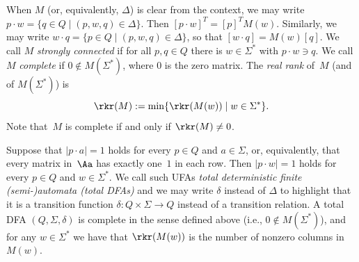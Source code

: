When $M$ (or, equivalently, $\Delta$) is clear from the context, we may write $p \cdot w = \{q \in Q \mid (p,w,q) \in \Delta\}$.
Then $[p \cdot w]^T = [p]^T M(w)$.
Similarly, we may write $w \cdot q = \{p \in Q \mid (p,w,q) \in \Delta\}$, so that $[w \cdot q] = M(w) [q]$. 
We call $M$ \emph{strongly connected} if for all $p,q \in Q$ there is $w \in \Sigma^*$ with $p \cdot w \ni q$. 
We call $M$ \emph{complete} if $0 \not\in M(\Sigma^*)$, where $0$ is the zero matrix.
The \emph{real rank} of~$M$ (and of $M(\Sigma^*)$) is 
\[\rkr(M) := \min\{\rkr(M(w)) \mid w \in \Sigma^*\}.\]
Note that~$M$ is complete if and only if $\rkr(M) \ne 0$.

Suppose that $|p \cdot a| = 1$ holds for every $p \in Q$ and $a \in \Sigma$, or, equivalently, that every matrix in~$\Aa$ has exactly one~$1$ in each row.
Then $|p \cdot w| = 1$ holds for every $p \in Q$ and $w \in \Sigma^*$.
We call such UFAs \emph{total deterministic finite (semi-)automata (total DFAs)} and we may write $\delta$ instead of $\Delta$ to highlight that it is a transition function $\delta \colon Q \times \Sigma \to Q$ instead of a transition relation.
A total DFA $(Q, \Sigma, \delta)$ is complete in the sense defined above (i.e., $0 \not\in M(\Sigma^*)$), and for any $w \in \Sigma^*$ we have that $\rkr(M(w))$ is the number of nonzero columns in~$M(w)$.
